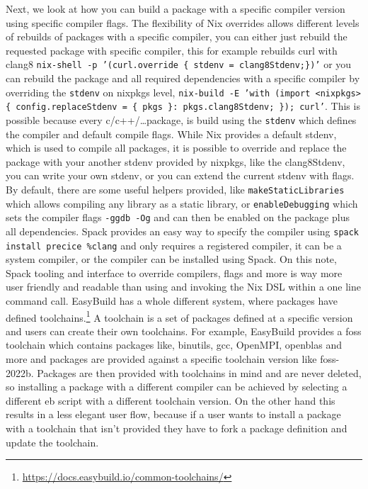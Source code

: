 \documentclass{eceasst}
\begin{document}
Next, we look at how you can build a package with a specific compiler version using specific compiler flags.
The flexibility of Nix overrides allows different levels of rebuilds of packages with a specific compiler, you can either just rebuild the requested package with specific compiler, this for example rebuilds curl with clang8 \texttt{nix-shell -p '(curl.override \{ stdenv = clang8Stdenv;\})'} or you can rebuild the package and all required dependencies with a specific compiler by overriding the \texttt{stdenv} on nixpkgs level, \texttt{nix-build -E 'with (import <nixpkgs> \{ config.replaceStdenv = \{ pkgs \}: pkgs.clang8Stdenv; \}); curl'}.
This is possible because every c/c++/\ldots package, is build using the \texttt{stdenv} which defines the compiler and default compile flags.
While Nix provides a default stdenv, which is used to compile all packages, it is possible to override and replace the package with your another stdenv provided by nixpkgs, like the clang8Stdenv, you can write your own stdenv, or you can extend the current stdenv with flags.
By default, there are some useful helpers provided, like \texttt{makeStaticLibraries} which allows compiling any library as a static library, or \texttt{enableDebugging} which sets the compiler flags \texttt{-ggdb -Og} and can then be enabled on the package plus all dependencies.
Spack provides an easy way to specify the compiler using \texttt{spack install precice \%clang} and only requires a registered compiler, it can be a system compiler, or the compiler can be installed using Spack.
On this note, Spack tooling and interface to override compilers, flags and more is way more user friendly and readable than using and invoking the Nix DSL within a one line command call.
EasyBuild has a whole different system, where packages have defined toolchains.\footnote{\url{https://docs.easybuild.io/common-toolchains/}}
A toolchain is a set of packages defined at a specific version and users can create their own toolchains.
For example, EasyBuild provides a foss toolchain which contains packages like, binutils, gcc, OpenMPI, openblas and more and packages are provided against a specific toolchain version like foss-2022b.
Packages are then provided with toolchains in mind and are never deleted, so installing a package with a different compiler can be achieved by selecting a different eb script with a different toolchain version.
On the other hand this results in a less elegant user flow, because if a user wants to install a package with a toolchain that isn't provided they have to fork a package definition and update the toolchain.\\
\end{document}
